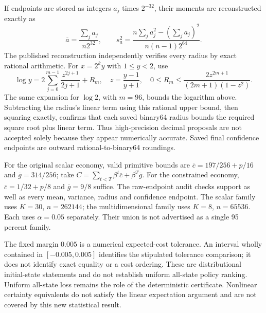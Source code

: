 If endpoints are stored as integers $a_j$ times $2^{-32}$, their moments are reconstructed exactly as
\[
 \overline a=\frac{\sum_ja_j}{n2^{32}},\qquad
 s_a^2=\frac{n\sum_ja_j^2-(\sum_ja_j)^2}{n(n-1)2^{64}}.
\]
The published reconstruction independently verifies every radius by exact rational arithmetic. For $x=2^ky$ with $1\le y<2$, use
\[
 \log y=2\sum_{j=0}^{m-1}\frac{z^{2j+1}}{2j+1}+R_m,
 \quad z=\frac{y-1}{y+1},\quad
 0\le R_m\le\frac{2z^{2m+1}}{(2m+1)(1-z^2)}.
\]
The same expansion for $\log2$, with $m=96$, bounds the logarithm above. Subtracting the radius's linear term using this rational upper bound, then squaring exactly, confirms that each saved binary64 radius bounds the required square root plus linear term. Thus high-precision decimal proposals are not accepted solely because they appear numerically accurate. Saved final confidence endpoints are outward rational-to-binary64 roundings.

For the original scalar economy, valid primitive bounds are
$\overline c=197/256+p/16$ and $\overline g=314/256$; take
$C=\sum_{t<T}\beta^t\overline c+\beta^T\overline g$.
For the constrained economy, $\overline c=1/32+p/8$ and $\overline g=9/8$ suffice. The raw-endpoint audit checks support as well as every mean, variance, radius and confidence endpoint. The scalar family uses $K=30$, $n=262144$; the multidimensional family uses $K=8$, $n=65536$. Each uses $\alpha=0.05$ separately. Their union is not advertised as a single 95 percent family.

The fixed margin $0.005$ is a numerical expected-cost tolerance. An interval wholly contained in $[-0.005,0.005]$ identifies the stipulated tolerance comparison; it does not identify exact equality or a cost ordering. These are distributional initial-state statements and do not establish uniform all-state policy ranking. Uniform all-state loss remains the role of the deterministic certificate. Nonlinear certainty equivalents do not satisfy the linear expectation argument and are not covered by this new statistical result.



